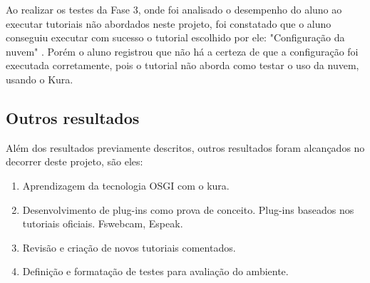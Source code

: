 Ao realizar os testes da Fase 3, onde foi analisado o desempenho do aluno ao executar tutoriais não abordados neste projeto, foi constatado que o aluno conseguiu executar com sucesso o tutorial escolhido por ele: "Configuração da nuvem" \cite{CloudConfiguration}. Porém o aluno registrou que não há a certeza de que a configuração foi executada corretamente, pois o tutorial não aborda como testar o uso da nuvem, usando o Kura.

\subsection{Outros resultados}

Além dos resultados previamente descritos, outros resultados foram alcançados no decorrer deste projeto, são eles:

\begin{enumerate}
  \item Aprendizagem da tecnologia OSGI com o kura.
  \item Desenvolvimento de plug-ins como prova de conceito.
  \subitem Plug-ins baseados nos tutoriais oficiais.
  \subitem Fswebcam, Espeak.
  \item Revisão e criação de novos tutoriais comentados.
  \item Definição e formatação de testes para avaliação do ambiente.
\end{enumerate} 